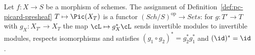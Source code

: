 \begin{lemma}\label{lem:pc-pic-presheaf-functorial}
Let $f:X\to S$ be a morphism of schemes.  The assignment of
Definition~\ref{def:pc-picard-presheaf}
$T\mapsto\Pic(X_T)$ is a functor
$(\mathit{Sch}/S)^{\mathrm{op}}\to\textit{Sets}$: for $g:T'\to T$ with
$g_X:X_{T'}\to X_T$ the map $\cL\mapsto g_X^*\cL$ sends invertible
modules to invertible modules, respects isomorphisms and satisfies
$(g_1\circ g_2)^*=g_2^*g_1^*$ and $(\id)^*=\id$.
\leanok
\end{lemma}

